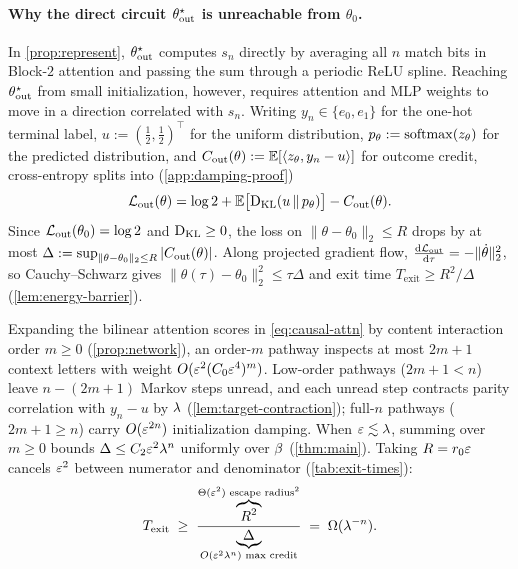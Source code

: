 \paragraph{Why the direct circuit $\theta^\star_{\mathrm{out}}$ is unreachable from $\theta_0$.}
In \cref{prop:represent}, $\theta^\star_{\mathrm{out}}$ computes $s_n$ directly by averaging all $n$ match bits in Block-$2$ attention and passing the sum through a periodic ReLU spline. Reaching $\theta^\star_{\mathrm{out}}$ from small initialization, however, requires attention and MLP weights to move in a direction correlated with $s_n$. Writing $y_n \in \{e_0, e_1\}$ for the one-hot terminal label, $u := (\frac{1}{2}, \frac{1}{2})^\top$ for the uniform distribution, $p_\theta := \operatorname{softmax}(z_\theta)$ for the predicted distribution, and $C_{\mathrm{out}}(\theta) := \mathbb E[\langle z_\theta, y_n - u\rangle]$ for outcome credit, cross-entropy splits into (\cref{app:damping-proof})
\[
  \mathcal L_{\mathrm{out}}(\theta) = \log 2 + \mathbb E\bigl[\mathrm{D}_{\mathrm{KL}}(u \,\|\, p_\theta)\bigr] - C_{\mathrm{out}}(\theta).
\]
Since $\mathcal L_{\mathrm{out}}(\theta_0) = \log 2$ and $\mathrm{D}_{\mathrm{KL}} \ge 0$, the loss on $\|\theta - \theta_0\|_2 \le R$ drops by at most $\Delta := \sup_{\|\theta - \theta_0\|_2 \le R}|C_{\mathrm{out}}(\theta)|$. Along projected gradient flow, $\ddtau{\Lout} = -\|\dot\theta\|_2^2$, so Cauchy--Schwarz gives $\|\theta(\tau) - \theta_0\|_2^2 \le \tau\Delta$ and exit time $T_{\mathrm{exit}} \ge R^2/\Delta$ (\cref{lem:energy-barrier}).

Expanding the bilinear attention scores in \cref{eq:causal-attn} by content interaction order $m \ge 0$ (\cref{prop:network}), an order-$m$ pathway inspects at most $2m + 1$ context letters with weight $O(\varepsilon^2(C_0\varepsilon^4)^m)$. Low-order pathways ($2m + 1 < n$) leave $n - (2m + 1)$ Markov steps unread, and each unread step contracts parity correlation with $y_n - u$ by $\lambda$ (\cref{lem:target-contraction}); full-$n$ pathways ($2m + 1 \ge n$) carry $O(\varepsilon^{2n})$ initialization damping. When $\varepsilon \lesssim \lambda$, summing over $m \ge 0$ bounds $\Delta \le C_2\varepsilon^2\lambda^n$ uniformly over $\beta$ (\cref{thm:main}). Taking $R = r_0\varepsilon$ cancels $\varepsilon^2$ between numerator and denominator (\cref{tab:exit-times}):
\begin{equation}
  T_{\mathrm{exit}} \;\ge\;
  \frac{\overbrace{R^2}^{\Theta(\varepsilon^2)\text{ escape radius}^2}}{\underbrace{\Delta}_{O(\varepsilon^2\lambda^n)\text{ max credit}}}
  \;=\; \Omega(\lambda^{-n}).
  \label{eq:energy-ratio}
\end{equation}

